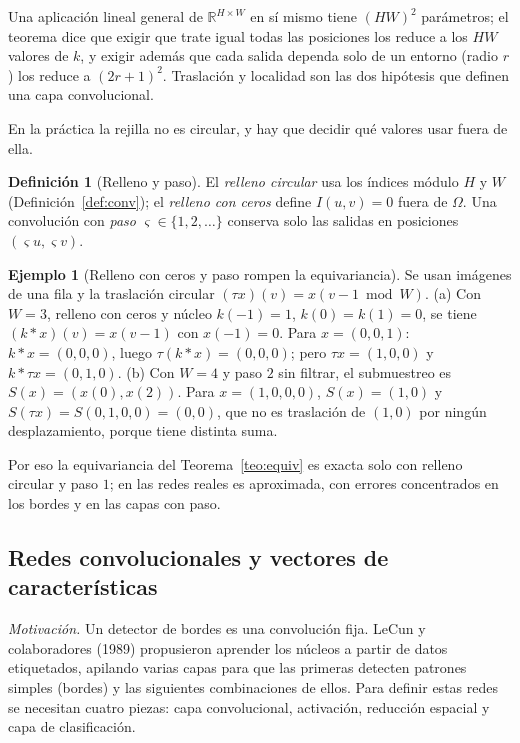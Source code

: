 \documentclass[11pt]{article}
\theoremstyle{definition}
\newtheorem{definicion}[teorema]{Definición}
\newtheorem{ejemplo}[teorema]{Ejemplo}
\theoremstyle{remark}
\newcommand{\R}{\mathbb{R}}
\begin{document}
\noindent Una aplicación lineal general de $\R^{H\times W}$ en sí mismo tiene $(HW)^2$ parámetros; el teorema dice que exigir que trate igual todas las posiciones los reduce a los $HW$ valores de $k$, y exigir además que cada salida dependa solo de un entorno (radio $r$) los reduce a $(2r+1)^2$. Traslación y localidad son las dos hipótesis que definen una capa convolucional.

\medskip

\noindent En la práctica la rejilla no es circular, y hay que decidir qué valores usar fuera de ella.

\begin{definicion}[Relleno y paso]\label{def:relleno}
\noindent El \emph{relleno circular} usa los índices módulo $H$ y $W$ (Definición~\ref{def:conv}); el \emph{relleno con ceros} define $I(u,v)=0$ fuera de $\Omega$. Una convolución con \emph{paso} $\varsigma\in\{1,2,\dots\}$ conserva solo las salidas en posiciones $(\varsigma u,\varsigma v)$.
\end{definicion}

\begin{ejemplo}[Relleno con ceros y paso rompen la equivariancia]\label{ej:rompe}
\noindent Se usan imágenes de una fila y la traslación circular $(\tau x)(v)=x(v-1\bmod W)$. (a) Con $W=3$, relleno con ceros y núcleo $k(-1)=1$, $k(0)=k(1)=0$, se tiene $(k*x)(v)=x(v-1)$ con $x(-1)=0$. Para $x=(0,0,1)$: $k*x=(0,0,0)$, luego $\tau(k*x)=(0,0,0)$; pero $\tau x=(1,0,0)$ y $k*\tau x=(0,1,0)$. (b) Con $W=4$ y paso $2$ sin filtrar, el submuestreo es $S(x)=(x(0),x(2))$. Para $x=(1,0,0,0)$, $S(x)=(1,0)$ y $S(\tau x)=S(0,1,0,0)=(0,0)$, que no es traslación de $(1,0)$ por ningún desplazamiento, porque tiene distinta suma.
\end{ejemplo}

\noindent Por eso la equivariancia del Teorema~\ref{teo:equiv} es exacta solo con relleno circular y paso $1$; en las redes reales es aproximada, con errores concentrados en los bordes y en las capas con paso.

\subsection{Redes convolucionales y vectores de características}\label{sec:cnn}

\noindent \emph{Motivación.} Un detector de bordes es una convolución fija. LeCun y colaboradores (1989) propusieron aprender los núcleos a partir de datos etiquetados, apilando varias capas para que las primeras detecten patrones simples (bordes) y las siguientes combinaciones de ellos. Para definir estas redes se necesitan cuatro piezas: capa convolucional, activación, reducción espacial y capa de clasificación.
\end{document}
